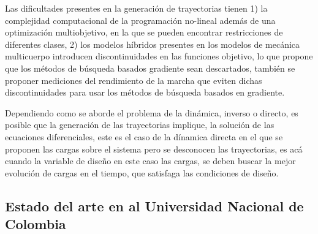\documentclass[12pt,twoside,onecolumn,letterpaper]{article}
\begin{document}
Las dificultades presentes en la generaci\'on de trayectorias tienen 1) la complejidad computacional de la programaci\'on no-lineal adem\'as de una optimizaci\'on multiobjetivo, en la que se pueden encontrar restricciones de diferentes clases\cite{Mahmoodabadi2014}, 2) los modelos h\'ibridos presentes en los modelos de mec\'anica multicuerpo introducen discontinuidades en las funciones objetivo, lo que propone que los m\'etodos de b\'usqueda basados gradiente sean descartados\cite{Xiang2010}, tambi\'en se proponer mediciones del rendimiento de la marcha que eviten dichas discontinuidades para usar los m\'etodos de b\'usqueda basados en gradiente\cite{Xiang2010}.\par
Dependiendo como se aborde el problema de la din\'amica, inverso o directo, es posible que la generaci\'on de las trayectorias implique, la soluci\'on de las ecuaciones diferenciales, este es el caso de la d\'inamica directa en el que se proponen las cargas sobre el sistema pero se desconocen las trayectorias, es ac\'a cuando la variable de dise\~no en este caso las cargas, se deben buscar la mejor evoluci\'on de cargas en el tiempo, que satisfaga las condiciones de dise\~no.\par

\subsection{Estado del arte en al Universidad Nacional de Colombia}
\label{sec:estadoUN}
\end{document}
